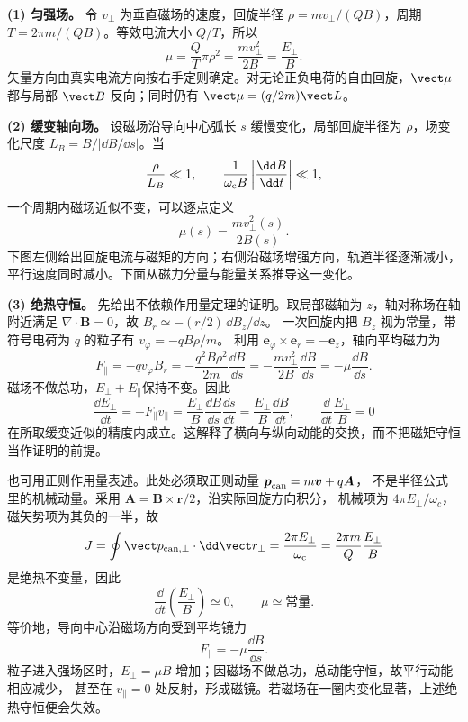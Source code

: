 \begin{xesolution}
\textbf{(1) 匀强场。}
令 $v_\perp$ 为垂直磁场的速度，回旋半径 $\rho=mv_\perp/(Q B)$，周期
$T=2\pi m/(QB)$。等效电流大小 $Q/T$，所以
\begin{equation}
  \boxed{\mu=\frac{Q}{T}\pi\rho^2
  =\frac{mv_\perp^2}{2B}=\frac{E_\perp}{B}}.
\end{equation}
矢量方向由真实电流方向按右手定则确定。对无论正负电荷的自由回旋，$\vect\mu$ 都与局部
$\vect B$ 反向；同时仍有 $\vect\mu=(q/2m)\vect L$。

\textbf{(2) 缓变轴向场。}
设磁场沿导向中心弧长 $s$ 缓慢变化，局部回旋半径为 $\rho$，场变化尺度
$L_B=B/|\dd B/\dd s|$。当
\begin{equation}
  \frac{\rho}{L_B}\ll1,
  \qquad
  \frac1{\omega_{\rm c}B}\left|\frac{\dd B}{\dd t}\right|\ll1,
\end{equation}
一个周期内磁场近似不变，可以逐点定义
\begin{equation}
  \boxed{\mu(s)=\frac{mv_\perp^2(s)}{2B(s)}}.
\end{equation}
下图左侧给出回旋电流与磁矩的方向；右侧沿磁场增强方向，轨道半径逐渐减小，
平行速度同时减小。下面从磁力分量与能量关系推导这一变化。
\magneticMomentDiagram

\textbf{(3) 绝热守恒。}
先给出不依赖作用量定理的证明。取局部磁轴为 $z$，轴对称场在轴附近满足
$\nabla\cdot\boldsymbol B=0$，故 $B_r\simeq-(r/2)\,\dd B_z/\dd z$。
一次回旋内把 $B_z$ 视为常量，带符号电荷为 $q$ 的粒子有 $v_\varphi=-qB\rho/m$。
利用 $\boldsymbol e_\varphi\times\boldsymbol e_r=-\boldsymbol e_z$，轴向平均磁力为
\[
 F_\parallel=-qv_\varphi B_r
 =-\frac{q^2B\rho^2}{2m}\frac{\dd B}{\dd s}
 =-\frac{mv_\perp^2}{2B}\frac{\dd B}{\dd s}=-\mu\frac{\dd B}{\dd s}.
\]
磁场不做总功，$E_\perp+E_\parallel$保持不变。因此
\[
 \frac{\dd E_\perp}{\dd t}=-F_\parallel v_\parallel
 =\frac{E_\perp}{B}\frac{\dd B}{\dd s}\frac{\dd s}{\dd t}
 =\frac{E_\perp}{B}\frac{\dd B}{\dd t},\qquad
 \frac{\dd}{\dd t}\frac{E_\perp}{B}=0
\]
在所取缓变近似的精度内成立。这解释了横向与纵向动能的交换，而不把磁矩守恒当作证明的前提。

也可用正则作用量表述。此处必须取正则动量 $\boldsymbol p_{\rm can}=m\boldsymbol v+q\boldsymbol A$，
不是半径公式里的机械动量。采用 $\boldsymbol A=\boldsymbol B\times\boldsymbol r/2$，沿实际回旋方向积分，
机械项为 $4\pi E_\perp/\omega_c$，磁矢势项为其负的一半，故
\begin{equation}
  J=\oint\vect p_{{\rm can},\perp}\cdot\dd\vect r_\perp
  =\frac{2\pi E_\perp}{\omega_{\rm c}}
  =\frac{2\pi m}{Q}\frac{E_\perp}{B}
\end{equation}
是绝热不变量，因此
\begin{equation}
  \boxed{\frac{\dd}{\dd t}\left(\frac{E_\perp}{B}\right)\simeq0},
  \qquad \boxed{\mu\simeq\text{常量}}.
\end{equation}
等价地，导向中心沿磁场方向受到平均镜力
\begin{equation}
  F_\parallel=-\mu\frac{\dd B}{\dd s}.
\end{equation}
粒子进入强场区时，$E_\perp=\mu B$ 增加；因磁场不做总功，总动能守恒，故平行动能相应减少，
甚至在 $v_\parallel=0$ 处反射，形成磁镜。若磁场在一圈内变化显著，上述绝热守恒便会失效。

\end{xesolution}
